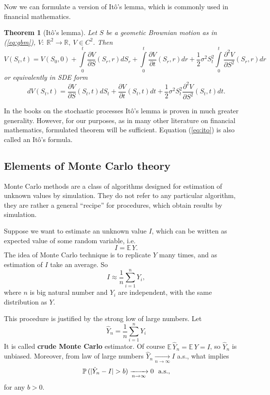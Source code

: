 \documentclass[a4paper,12pt, twoside]{article}
\newtheorem{thm}{Theorem}[section]
\theoremstyle{definition}
\theoremstyle{remark}
\def\E{{\mathbb{E}}\,}
\def\P{{\mathbb{P}}\,}
\def\conv{\xrightarrow[n \rightarrow \infty]{}}
\begin{document}
\noindent Now we can formulate a version of It\^{o}'s lemma, which is commonly used in financial mathematics.
\begin{thm}[It\^{o}'s lemma]
  Let $S$ be a geometic Brownian motion as in (\ref{eq:gbm}), $V:\ \mathbb{R}^2 \rightarrow \mathbb{R},\ V \in C^2$. Then 
  \begin{equation*}
   V(S_t, t) = V(S_0, 0) + \int\limits_0^t \frac{\partial V}{\partial S}(S_r,r)dS_r + \int\limits_0^t \frac{\partial V}{\partial t}(S_r,r)dr + \frac{1}{2}\sigma^2 S_t^2 \int\limits_0^t \frac{\partial^2 V}{\partial S^2}(S_r,r)dr
  \end{equation*}
  or equivalently in SDE form
  \begin{equation}
   \label{eq:ito}
   dV(S_t, t) = \frac{\partial V}{\partial S}(S_t,t)dS_t + \frac{\partial V}{\partial t}(S_t,t)dt + \frac{1}{2}\sigma^2 S_t^2 \frac{\partial^2 V}{\partial S^2}(S_t,t)dt   .
  \end{equation}  
\end{thm}

\noindent In the books on the stochastic processes It\^{o}'s lemma is proven in much greater generality. However, for our purposes, as in many other literature on financial mathematics, formulated theorem will be sufficient. Equation (\ref{eq:ito}) is also called an It\^{o}'s formula.


\subsection{Elements of Monte Carlo theory}
Monte Carlo methods are a class of algorithms designed for estimation of unknown values by simulation. They do not refer to any particular algorithm, they are rather a general ``recipe'' for procedures, which obtain results by simulation.

Suppose we want to estimate an unknown value $I$, which can be written as expected value of some random variable, i.e.
\[ I = \E Y. \]
The idea of Monte Carlo technique is to replicate $Y$ many times, and as estimation of $I$ take an average. So
\[ I \approx \frac{1}{n} \sum\limits_{i=1}^n Y_i, \]
where $n$ is big natural number and $Y_i$ are independent, with the same distribution as $Y$.

This procedure is justified by the strong low of large numbers. Let 
\begin{equation}
 \label{eq:CMC}
 \hat{Y}_n = \frac{1}{n}\sum\limits_{i=1}^n Y_i
\end{equation}
It is called \textbf{crude Monte Carlo} estimator. Of course $\E\hat{Y}_n = \E Y = I$, so $\hat{Y}_n$ is unbiased. Moreover, from law of large numbers $\hat{Y}_n \conv I$ a.s., what implies 
\[ \P(|\hat{Y}_n - I| > b) \conv 0 \hbox{\ \ a.s.,} \]
for any $b > 0$. 
\end{document}
